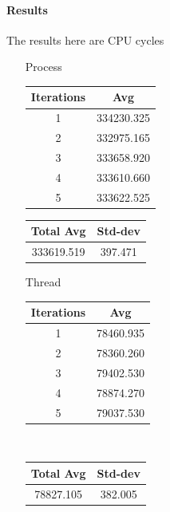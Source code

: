 \paragraph{Results}

The results here are CPU cycles

\begin{enumerate}
    \item [Process]
        \begin{center}
            \begin{tabular}{||c c||} 
             \hline
             Iterations & Avg \\ [0.5ex] 
             \hline\hline
             1 & 334230.325  \\ 
             \hline
             2 & 332975.165  \\ 
             \hline
             3 & 333658.920  \\ 
             \hline
             4 & 333610.660 \\ 
             \hline
             5 & 333622.525  \\ 
             \hline
             \hline
            \end{tabular}
            \begin{tabular}{||c c||} 
             \hline
             Total Avg & Std-dev \\ [0.5ex] 
             \hline\hline
             333619.519 & 397.471 \\ 
             \hline
             \hline
            \end{tabular}
        \end{center}
    \item [Thread]
        \begin{center}
            \begin{tabular}{||c c||} 
                 \hline
                 Iterations & Avg \\ [0.5ex] 
                 \hline\hline
                 1 & 78460.935  \\ 
                 \hline
                 2 & 78360.260  \\ 
                 \hline
                 3 & 79402.530  \\ 
                 \hline
                 4 & 78874.270 \\ 
                 \hline
                 5 & 79037.530 \\ 
                 \hline
                 \hline
            \end{tabular} \\
            \begin{tabular}{||c c||} 
                 \hline
                 Total Avg & Std-dev \\ [0.5ex] 
                 \hline\hline
                 78827.105 & 382.005\\ 
                 \hline
                \hline
            \end{tabular}
        \end{center}
\end{enumerate}

